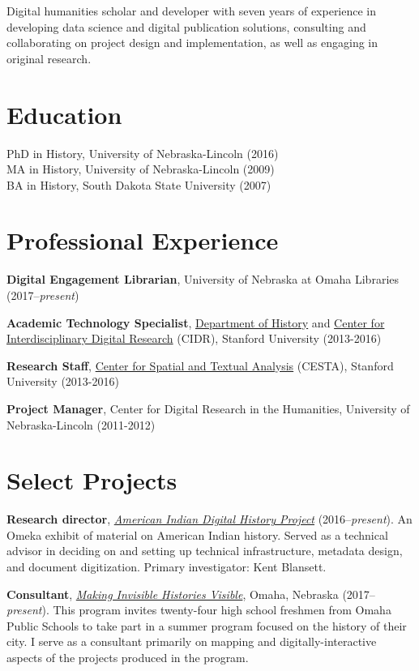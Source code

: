 Digital humanities scholar and developer with seven years of experience
in developing data science and digital publication solutions, consulting
and collaborating on project design and implementation, as well as
engaging in original research.

\section{Education}\label{education}

PhD in History, University of Nebraska-Lincoln (2016)\\
MA in History, University of Nebraska-Lincoln (2009)\\
BA in History, South Dakota State University (2007)

\section{Professional Experience}\label{professional-experience}

\textbf{Digital Engagement Librarian}, University of Nebraska at Omaha
Libraries (2017--\emph{present})

\textbf{Academic Technology Specialist},
\href{http://history.stanford.edu}{Department of History} and
\href{http://cidr.stanford.edu}{Center for Interdisciplinary Digital
Research} (CIDR), Stanford University (2013-2016)

\textbf{Research Staff}, \href{http://cesta.stanford.edu}{Center for
Spatial and Textual Analysis} (CESTA), Stanford University (2013-2016)

\textbf{Project Manager}, Center for Digital Research in the Humanities,
University of Nebraska-Lincoln (2011-2012)

\section{Select Projects}\label{select-projects}

\textbf{Research director}, \emph{\href{http://aidhp.com}{American
Indian Digital History Project}} (2016--\emph{present}). An Omeka
exhibit of material on American Indian history. Served as a technical
advisor in deciding on and setting up technical infrastructure, metadata
design, and document digitization. Primary investigator: Kent Blansett.

\textbf{Consultant}, \emph{\href{http://invisiblehistory.ops.org}{Making
Invisible Histories Visible}}, Omaha, Nebraska (2017--\emph{present}).
This program invites twenty-four high school freshmen from Omaha Public
Schools to take part in a summer program focused on the history of their
city. I serve as a consultant primarily on mapping and
digitally-interactive aspects of the projects produced in the program.

